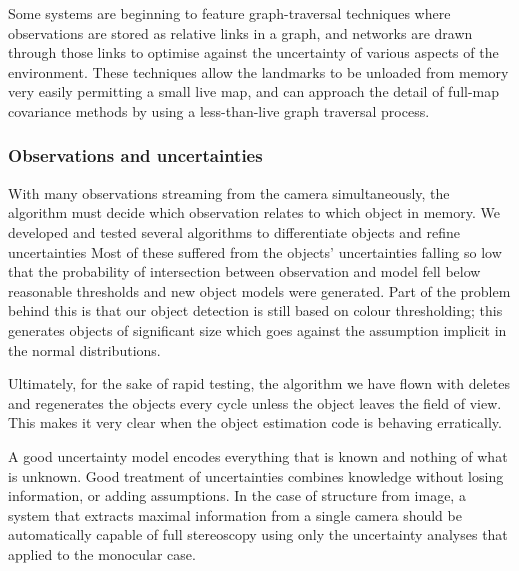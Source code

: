 \documentclass{article}
\newcounter{subsubsubsection}[subsubsection]
\begin{document}
      Some systems are beginning to feature graph-traversal techniques where observations are stored as relative links in a graph, and networks are drawn through those links to optimise against the uncertainty of various aspects of the environment.  These techniques allow the landmarks to be unloaded from memory very easily permitting a small live map, and can approach the detail of full-map covariance methods by using a less-than-live graph traversal process.

    \subsubsection{Observations and uncertainties}

        \label{sec:objectAllocation}
        With many observations streaming from the camera simultaneously, the algorithm must decide which observation relates to which object in memory.  We developed and tested several algorithms to differentiate objects and refine uncertainties
        Most of these suffered from the objects' uncertainties falling so low that the probability of intersection between observation and model fell below reasonable thresholds and new object models were generated.  Part of the problem behind this is that our object detection is still based on colour thresholding; this generates objects of significant size which goes against the assumption implicit in the normal distributions.

        Ultimately, for the sake of rapid testing, the algorithm we have flown with deletes and regenerates the objects every cycle unless the object leaves the field of view.  This makes it very clear when the object estimation code is behaving erratically.

        \label{sec:UncertaintyAnalysis}

        A good uncertainty model encodes everything that is known and nothing of what is unknown.  Good treatment of uncertainties combines knowledge without losing information, or adding assumptions.
        In the case of structure from image, a system that extracts maximal information from a single camera should be automatically capable of full stereoscopy using only the uncertainty analyses that applied to the monocular case.
      
\end{document}
